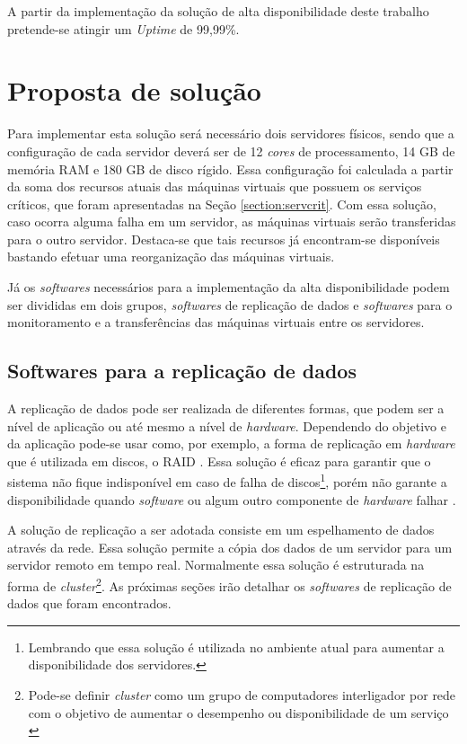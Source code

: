 A partir da implementação da solução de alta disponibilidade deste trabalho pretende-se atingir um \textit{Uptime} de 99,99\%.

\section{Proposta de solução}
\label{section:propostasolucao}

Para implementar esta solução será necessário dois servidores físicos, sendo que a configuração de cada servidor deverá ser de 
12 \textit{cores} de processamento, 14 GB de memória \ac{RAM} e 180 GB de disco rígido. Essa configuração foi calculada a partir da soma dos 
recursos atuais das máquinas virtuais que possuem os serviços críticos, que foram apresentadas na Seção \ref{section:servcrit}.
Com essa solução, caso ocorra alguma falha em um servidor, as máquinas virtuais serão transferidas para o outro servidor.
Destaca-se que tais recursos já encontram-se disponíveis bastando efetuar uma reorganização das máquinas virtuais.

Já os \textit{softwares} necessários para a implementação da alta disponibilidade podem ser divididas em dois grupos, \textit{softwares} de 
replicação de dados e \textit{softwares} para o monitoramento e a transferências das máquinas virtuais entre os servidores.

\subsection{Softwares para a replicação de dados}
\label{section:toolrepl}

A replicação de dados pode ser realizada de diferentes formas, que podem ser a nível de aplicação ou até mesmo a nível de \textit{hardware}.
Dependendo do objetivo e da aplicação pode-se usar como, por exemplo, a forma de replicação em \textit{hardware} que é utilizada em discos, o 
\ac{RAID} \cite{raid}. Essa solução é eficaz para garantir que o sistema não fique indisponível em caso de falha de discos\footnote[2]{Lembrando 
que essa solução é utilizada no ambiente atual para aumentar a disponibilidade dos servidores.}, porém não garante a disponibilidade quando 
\textit{software} ou algum outro componente de \textit{hardware} falhar \cite{zaminhani2008}.

A solução de replicação a ser adotada consiste em um espelhamento de dados através da rede. Essa solução permite a cópia dos dados de um servidor
para um servidor remoto em tempo real. Normalmente essa solução é estruturada na forma de \textit{cluster}\footnote[1]{Pode-se definir 
\textit{cluster} como um grupo de computadores interligador por rede com o objetivo de aumentar o desempenho ou disponibilidade de um serviço 
\cite{freitas2005}}.
As próximas seções irão detalhar os \textit{softwares} de replicação de dados que foram encontrados.

